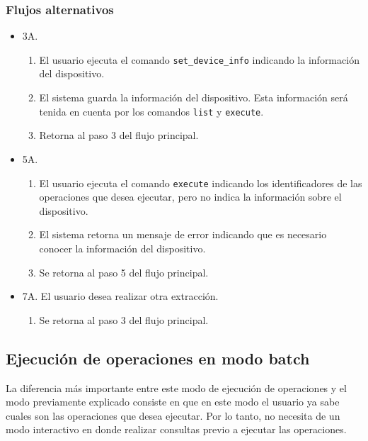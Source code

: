 \subsubsection*{Flujos alternativos}

\begin{itemize}
\item 3A.
    \begin{enumerate}
    \item El usuario ejecuta el comando \texttt{set\_device\_info} indicando la información del dispositivo.
    \item El sistema guarda la información del dispositivo. Esta información será tenida en cuenta por los comandos \texttt{list} y \texttt{execute}.
    \item Retorna al paso 3 del flujo principal.
    \end{enumerate}
\end{itemize}

\begin{itemize}
\item 5A.
    \begin{enumerate}
    \item El usuario ejecuta el comando \texttt{execute} indicando los identificadores de las operaciones que desea ejecutar, pero no indica la información sobre el dispositivo.
    \item El sistema retorna un mensaje de error indicando que es necesario conocer la información del dispositivo.
    \item Se retorna al paso 5 del flujo principal.
    \end{enumerate}
\end{itemize}

\begin{itemize}
\item 7A. El usuario desea realizar otra extracción.
    \begin{enumerate}
    \item Se retorna al paso 3 del flujo principal.
    \end{enumerate}
\end{itemize}

\subsection{Ejecución de operaciones en modo batch}
La diferencia más importante entre este modo de ejecución de operaciones y el modo previamente explicado consiste en que en este modo el usuario ya sabe cuales son las operaciones que desea ejecutar. Por lo tanto, no necesita de un modo interactivo en donde realizar consultas previo a ejecutar las operaciones.


